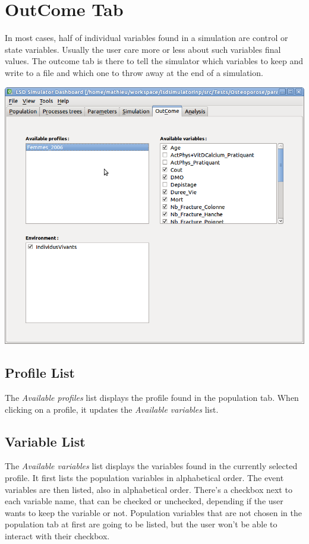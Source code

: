 \documentclass[a4paper,11pt]{report}
\begin{document}
\section{OutCome Tab}
In most cases, half of individual variables found in a simulation are control or state variables. Usually the user care more or less about such variables final values. The outcome tab is there to tell the simulator which variables to keep and write to a file and which one to throw away at the end of a simulation.

\begin{center}
\includegraphics[scale=0.3]{Pictures/Outcome/OutcomeTab.png}
\label{fig:outTab}
\end{center}

\subsection{Profile List}
The \emph{Available profiles} list displays the profile found in the population tab. When clicking on a profile, it updates the \emph{Available variables} list.

\subsection{Variable List}  
\label{subsec:outVar}
The \emph{Available variables} list displays the variables found in the currently selected profile. It first lists the population variables in alphabetical order. The event variables are then listed, also in alphabetical order. There's a checkbox next to each variable name, that can be checked or unchecked, depending if the user wants to keep the variable or not. Population variables that are not chosen in the population tab at first are going to be listed, but the user won't be able to interact with their checkbox.
\end{document}
